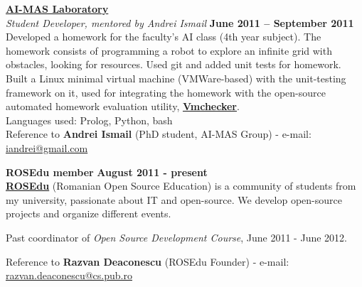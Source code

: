 \documentclass[margin,line]{resume}
\begin{document}
\begin{resume}
	\vspace{1.2mm}\href{http://aimas.cs.pub.ro/}{\textbf{AI-MAS Laboratory}}\vspace{1.5mm}\\
	\vspace{1mm} \textsl{Student Developer, mentored by Andrei Ismail} \hfill \textbf{June 2011 -- September 2011}\\
	Developed a homework for the faculty's AI class (4th year subject). The homework consists of programming a robot to explore an infinite
	grid with obstacles, looking for resources. Used git and added unit tests for homework. Built a Linux minimal virtual machine (VMWare-based)
	with the unit-testing framework on it, used for integrating the homework with the open-source automated homework evaluation
	utility, \href{https://elf.cs.pub.ro/vmchecker/ui/?locale=en}{\textbf{Vmchecker}}.\vspace{1.5mm}\\
	Languages used: Prolog, Python, bash \vspace{1.0mm}\\
	\small{Reference to \textbf{Andrei Ismail} (PhD student, AI-MAS Group) - e-mail: \href{mailto:iandrei@gmail.com}{iandrei@gmail.com}}

    \vspace{1.2mm}\textbf{ROSEdu member} \hfill \textbf{August 2011 - present} \vspace{1.5mm}\\
	\href{http://rosedu.org/}{\textbf{ROSEdu}} (Romanian Open Source Education) is a community of 
	students from my university, passionate about IT and open-source. We develop 
	open-source projects and organize different events.\vspace{1mm}
	\begin{list2}
        \item Past coordinator of \textit{Open Source Development Course}, June 2011 - June 2012.
	\end{list2}\vspace{-3mm}
	\small{Reference to \textbf{Razvan Deaconescu} (ROSEdu Founder)
		- e-mail: \href{mailto:razvan.deaconescu@cs.pub.ro}{razvan.deaconescu@cs.pub.ro}}



\end{resume}
\end{document}

